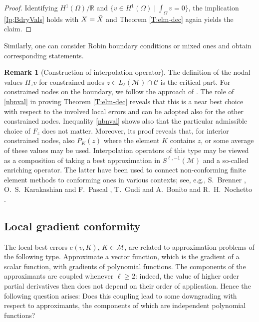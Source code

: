 \documentclass[a4paper]{amsart}
\numberwithin{equation}{section}
\theoremstyle{plain}
\theoremstyle{definition}
\newtheorem{rem}{Remark}[section]
\begin{document}
\begin{proof}
 Identifying
 ${H^{1}}(\Omega)/{\mathbb{R}}$ and $\{v\in{H^{1}}(\Omega) \mid \int_\Omega v = 0 \}$,
 the implication \eqref{Ip;BdryVals} holds with $X=\Tilde X$ and Theorem
 \eqref{T:elm-dec} again yields the claim.
\end{proof}
Similarly, one can consider Robin boundary conditions or mixed ones and obtain
corresponding statements.
 
\begin{rem}[Construction of interpolation operator]
\label{R:Ip}
The definition of the nodal values ${\Pi}_zv$ for constrained nodes
$z\in{L_{{\ell}}}({\mathcal{M}})\cap{\mathcal{C}}$ is the critical part.  For constrained
nodes on the boundary, we follow the approach of \cite{Scott.Zhang:90}.
The role of \eqref{nbnval} in proving Theorem \ref{T:elm-dec} reveals that this
is a near best choice with respect to the involved local errors and can be
adopted also for the other constrained nodes.  Inequality \eqref{nbnval} shows
also that the particular admissible choice of ${F}_z$ does not matter.
Moreover, its proof reveals that, for interior constrained nodes, also
$P_{K}(z)$ where the element ${K}$ contains $z$, or some average of these 
values may be used.  Interpolation operators of this type may be viewed as 
a composition of taking a best approximation in $S^{\ell,-1}({\mathcal{M}})$ and 
a so-called enriching operator.   The latter have been used to connect 
non-conforming finite element methods to conforming ones in various contexts; 
see, e.g., S.\ Brenner \cite{Brenner:96, Brenner:99}, O.\ S.\ Karakashian and 
F.\ Pascal \cite{Karakashian.Pascal:03}, T.\ Gudi \cite{Gudi:10} and A.\ Bonito 
and R.\ H.\ Nochetto \cite{Bonito.Nochetto:10}.
\end{rem}

\subsection{Local gradient conformity}
\label{S:grd-conformity}
The local best errors $e(v,{K})$, ${K}\in{\mathcal{M}}$, are related to approximation 
problems of the following type. Approximate a vector function, which is the 
gradient of a scalar function, with gradients of polynomial functions.  The 
components of the approximants are coupled whenever ${\ell}\geq2$: indeed, the 
value of higher order partial derivatives then does not depend on their order of 
application.  Hence the following question arises: Does this coupling lead to 
some downgrading with respect to approximants, the components of which are 
independent polynomial functions?
\end{document}
